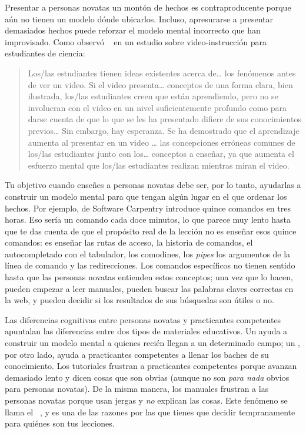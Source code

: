 Presentar a personas novatas un montón de hechos es contraproducente
porque aún no tienen un modelo dónde ubicarlos.
Incluso,
apresurarse a presentar demasiados hechos puede reforzar
el modelo mental incorrecto que han improvisado.
Como observó ~\cite{Mull2007a} en un estudio sobre video-instrucción para estudiantes de ciencia:

\begin{quote}
Los/las estudiantes tienen ideas existentes acerca de{\ldots} los fenómenos antes de ver un video. Si el video presenta{\ldots} conceptos de una forma clara, bien ilustrada, los/las estudiantes creen que están aprendiendo, pero no se involucran con el video en un nivel suficientemente profundo como para darse cuenta de que lo que se les ha presentado difiere de sus conocimientos previos{\ldots} Sin embargo, hay esperanza. Se ha demostrado que el aprendizaje aumenta al presentar en un video {\ldots} las concepciones erróneas comunes de los/las estudiantes junto con los{\ldots} conceptos a enseñar, ya que aumenta el esfuerzo mental que los/las estudiantes realizan mientras miran el video. 
\end{quote}

Tu objetivo cuando enseñes a personas novatas debe ser, por lo tanto,
ayudarlas a construir un modelo mental
para que tengan algún lugar en el que ordenar los hechos.
Por ejemplo,
 de Software Carpentry
introduce quince comandos en tres horas.
Eso sería un comando cada doce minutos,
lo que parece muy lento hasta que te das cuenta de que
el propósito real de la lección no es enseñar esos quince comandos:
es enseñar las rutas de acceso,
la historia de comandos,
el autocompletado con el tabulador,
los comodines,
los \emph{pipes}
los argumentos de la línea de comando
y las redirecciones.
Los comandos específicos no tienen sentido hasta que las personas novatas entienden estos conceptos;
una vez que lo hacen,
pueden empezar a leer manuales,
pueden buscar las palabras claves correctas en la web,
y pueden decidir si los resultados de sus búsquedas son útiles o no.

Las diferencias cognitivas entre personas novatas y practicantes competentes
apuntalan las diferencias entre dos tipos de materiales educativos.
Un  ayuda a construir un modelo mental a quienes recién llegan a un determinado campo;
un ,
por otro lado,
ayuda a practicantes competentes a llenar los baches de su conocimiento.
Los tutoriales frustran a practicantes competentes porque avanzan demasiado lento
y dicen cosas que son obvias
(aunque no son \emph{para nada} obvios para personas novatas).
De la misma manera,
los manuales frustran a las personas novatas porque usan jergas y \emph{no} explican las cosas.
Este fenómeno se llama el  ~\cite{Kaly2003},
y es una de las razones por las que tienes que decidir tempranamente para quiénes son tus lecciones. 

